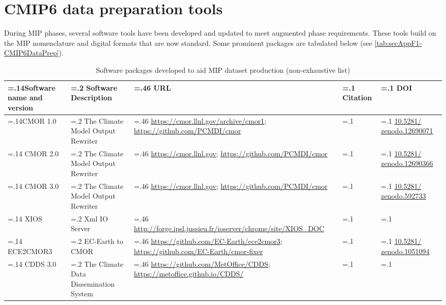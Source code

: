\documentclass[manuscript]{copernicus}
\begin{document}
\section{CMIP6 data preparation tools}  %
\label{sec:secAppF1-CMIP6DataPrep}

During MIP phases, several software tools have been developed and updated to meet augmented phase requirements. These tools build on the MIP nomenclature and digital formats that are now standard. Some prominent packages are tabulated below (see \autoref{tab:secAppF1-CMIP6DataPrep}).

\begin{table}[htp]
\renewcommand{\arraystretch}{2}
\scriptsize
\centering
\caption{Software packages developed to aid MIP dataset production (non-exhaustive list)}
\resizebox{\textwidth}{!} {
	\begin{tabularx}{0.9\textwidth} { 
	  | >{\raggedright\arraybackslash\hsize=.14\hsize}X
	  | >{\centering\arraybackslash\hsize=.2\hsize}X
	  | >{\centering\arraybackslash\hsize=.46\hsize}X
	  | >{\centering\arraybackslash\hsize=.1\hsize}X
	  | >{\centering\arraybackslash\hsize=.1\hsize}X | }
\hline
\textbf{Software name and version} & \textbf{Software Description} & \textbf{URL} & \textbf{Citation} & \textbf{DOI}\\ \hline
CMOR 1.0 & The Climate Model Output Rewriter & \url{https://cmor.llnl.gov/archive/cmor1}; \url{https://github.com/PCMDI/cmor} & \citet{taylor_cmor_2006} & \href{http://doi.org/10.5281/zenodo.12690071}{10.5281/ zenodo.12690071}\\ \hline
CMOR 2.0 & The Climate Model Output Rewriter & \url{https://cmor.llnl.gov}; \url{https://github.com/PCMDI/cmor} & \citet{doutriaux_cmor_2011} & \href{http://doi.org/10.5281/zenodo.12690366}{10.5281/ zenodo.12690366}\\ \hline
CMOR 3.0 & The Climate Model Output Rewriter & \url{https://cmor.llnl.gov}; \url{https://github.com/PCMDI/cmor} & \citet{doutriaux_cmor_2024} & \href{http://doi.org/10.5281/zenodo.592733}{10.5281/ zenodo.592733}\\ \hline
XIOS & Xml IO Server & \url{http://forge.ipsl.jussieu.fr/ioserver/chrome/site/XIOS\_DOC} & &\\ \hline
ECE2CMOR3 & EC-Earth to CMOR & \url{https://github.com/EC-Earth/ece2cmor3}; \url{https://github.com/EC-Earth/cmor-fixer} & & \href{http://doi.org/10.5281/zenodo.1051094}{10.5281/ zenodo.1051094}\\ \hline
CDDS 3.0 & The Climate Data Dissemination System & \url{https://github.com/MetOffice/CDDS}; \url{https://metoffice.github.io/CDDS/} & &\\ \hline

\end{tabularx}}
\end{table}
\end{document}
